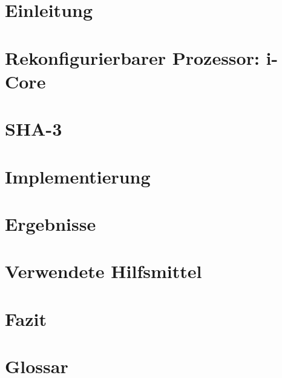 \renewcommand{\chaptername}{Kapitel}

\chapter{Einleitung}


\chapter{Rekonfigurierbarer Prozessor: i-Core}


\chapter{SHA-3}
\label{cha:sha3}


\chapter{Implementierung}


\newpage

\newpage


\chapter{Ergebnisse}
\label{cha:ergebnisse}


\chapter{Verwendete Hilfsmittel}


\chapter{Fazit}


\chapter{Glossar}

